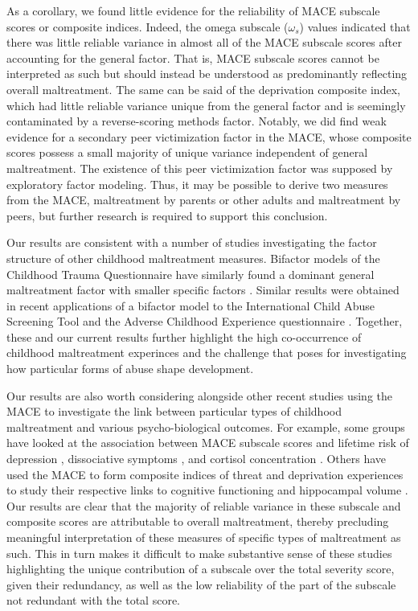 \documentclass[letterpaper,man,natbib]{apa6}  %
\begin{document}
As a corollary, we found little evidence for the reliability of MACE subscale scores or composite indices. Indeed, the omega subscale ($\omega_s$) values indicated that there was little reliable variance in almost all of the MACE subscale scores after accounting for the general factor. That is, MACE subscale scores cannot be interpreted as such but should instead be understood as predominantly reflecting overall maltreatment. The same can be said of the deprivation composite index, which had little reliable variance unique from the general factor and is seemingly contaminated by a reverse-scoring methods factor. Notably, we did find weak evidence for a secondary peer victimization factor in the MACE, whose composite scores possess a small majority of unique variance independent of general maltreatment. The existence of this peer victimization factor was supposed by exploratory factor modeling. Thus, it may be possible to derive two measures from the MACE, maltreatment by parents or other adults and maltreatment by peers, but further research is required to support this conclusion. 

Our results are consistent with a number of studies investigating the factor structure of other childhood maltreatment measures. Bifactor models of the Childhood Trauma Questionnaire have similarly found a dominant general maltreatment factor with smaller specific factors \citep{spinhoven2014childhood, hollerbach2018main, stagaki2022mediating}. Similar results were obtained in recent applications of a bifactor model to the International Child Abuse Screening Tool \citep{meinck2021factor} and the Adverse Childhood Experience questionnaire \citep{dobson2021latent}. Together, these and our current results further highlight the high co-occurrence of childhood maltreatment experinces and the challenge that poses for investigating how particular forms of abuse shape development.  
 
Our results are also worth considering alongside other recent studies using the MACE to investigate the link between particular types of childhood maltreatment and various psycho-biological outcomes. For example, some groups have looked at the association between MACE subscale scores and lifetime risk of depression \citep{gerke2018childhood}, dissociative symptoms \citep{schalinski2015type}, and cortisol concentration \citep{schalinski2019early}. Others have used the MACE to form composite indices of threat and deprivation experiences to study their respective links to cognitive functioning \citep{schalinski2018defining} and hippocampal volume \citep{teicher2018differential}. Our results are clear that the majority of reliable variance in these subscale and composite scores are attributable to overall maltreatment, thereby precluding meaningful interpretation of these measures of specific types of maltreatment as such. This in turn makes it difficult to make substantive sense of these studies highlighting the unique contribution of a subscale over the total severity score, given their redundancy, as well as the low reliability of the part of the subscale not redundant with the total score. 
\end{document}

